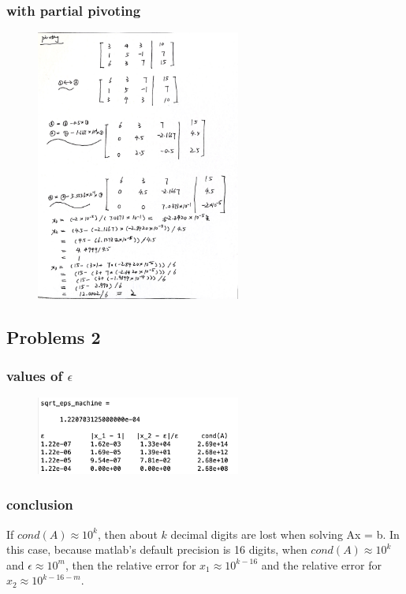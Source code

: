 \documentclass[11pt,fleqn]{exam}
\begin{document}
\subsubsection*{with partial pivoting}
\begin{figure}[H]
  	\centering
  	\includegraphics[width=0.6\textwidth]{q1_b}
\end{figure}

\subsection*{Problems 2}
\subsubsection*{values of $\epsilon$}
\begin{figure}[H]
  	\centering
  	\includegraphics[width=0.6\textwidth]{q2}
\end{figure}
\subsubsection*{conclusion}
If $cond(A) \approx 10^k$, then about $k$ decimal
digits are lost when solving Ax = b. In this case, because matlab's default precision is 16 digits, when $cond(A) \approx 10^k$ and $\epsilon \approx 10^m$, then the relative error for $x_1 \approx 10^{k - 16}$ and the relative error for $x_2 \approx 10^{k - 16 - m}$.
\end{document}
